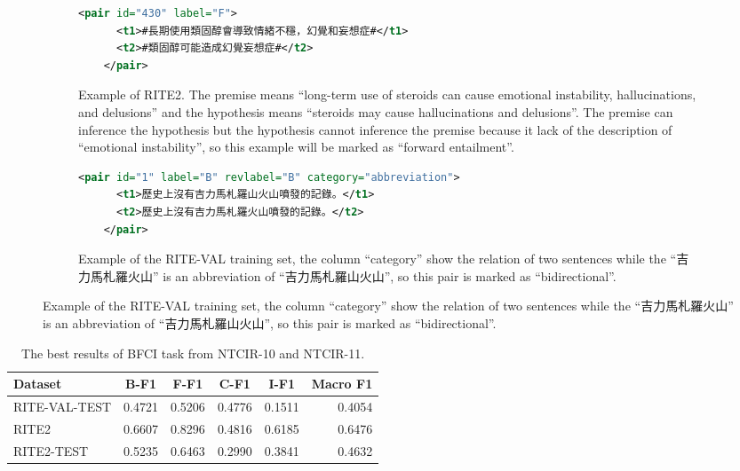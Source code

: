 \documentclass[12pt]{article}
\begin{document}
\begin{CJK*}{UTF8}{bkai}
\begin{spacing}{1.77}
\begin{figure}[ht!]
  \centering
  \caption{The examples of RITE2 and RITE-VAL}
  \begin{subfigure}{1\linewidth}
    \caption{Example of RITE2. The premise means ``long-term use of steroids can cause emotional instability, hallucinations, and delusions'' and the hypothesis means ``steroids may cause hallucinations and delusions''. The premise can inference the hypothesis but the hypothesis cannot inference the premise because it lack of the description of ``emotional instability'', so this example will be marked as ``forward entailment''.}
  \begin{minipage}{\linewidth}
  \begin{lstlisting}[language=XML]
    <pair id="430" label="F">
      <t1>#長期使用類固醇會導致情緒不穩，幻覺和妄想症#</t1>
      <t2>#類固醇可能造成幻覺妄想症#</t2>
    </pair>
  \end{lstlisting}
  \end{minipage}
  \end{subfigure}

  \begin{subfigure}{1\linewidth}
    \caption{Example of the RITE-VAL training set, the column ``category'' show the relation of two sentences while the ``吉力馬札羅火山'' is an abbreviation of ``吉力馬札羅山火山'', so this pair is marked as ``bidirectional''.}
    \begin{minipage}{\linewidth}
    \begin{lstlisting}[language=XML]
    <pair id="1" label="B" revlabel="B" category="abbreviation">
      <t1>歷史上沒有吉力馬札羅山火山噴發的記錄。</t1>
      <t2>歷史上沒有吉力馬札羅火山噴發的記錄。</t2>
    </pair>
    \end{lstlisting}
    \end{minipage}
  \end{subfigure}
\end{figure}


\begin{table}[H]
  \centering
  \setlength{\extrarowheight}{-3pt}
  \begin{tabular}{|l|r|r|r|r|r|}
  \hline
   Dataset & \multicolumn{1}{c|}{B-F1} & \multicolumn{1}{c|}{F-F1} & \multicolumn{1}{c|}{C-F1} & \multicolumn{1}{c|}{I-F1} & \multicolumn{1}{c|}{Macro F1} \\ \hline
  RITE-VAL-TEST & 0.4721 & 0.5206 & 0.4776 & 0.1511 & 0.4054 \\ \hline
  RITE2 & 0.6607 & 0.8296 & 0.4816 & 0.6185 & 0.6476 \\ \hline
  RITE2-TEST & 0.5235 & 0.6463 & 0.2990 & 0.3841 & 0.4632 \\ \hline
  \end{tabular}
  \caption{The best results of BFCI task from NTCIR-10 and NTCIR-11.}
  \label{result:bfci_ntcir}
\end{table}


\end{spacing}
\end{CJK*}
\end{document}
